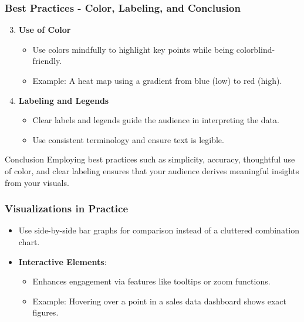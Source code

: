 \documentclass[aspectratio=169]{beamer}
\begin{document}
\begin{frame}[fragile]
    \frametitle{Best Practices - Color, Labeling, and Conclusion}
    \begin{enumerate}
        \setcounter{enumi}{2} %
        \item \textbf{Use of Color}
            \begin{itemize}
                \item Use colors mindfully to highlight key points while being colorblind-friendly.
                \item Example: A heat map using a gradient from blue (low) to red (high).
            \end{itemize}

        \item \textbf{Labeling and Legends}
            \begin{itemize}
                \item Clear labels and legends guide the audience in interpreting the data.
                \item Use consistent terminology and ensure text is legible.
            \end{itemize}
    \end{enumerate}

    \begin{block}{Conclusion}
    Employing best practices such as simplicity, accuracy, thoughtful use of color, and clear labeling ensures that your audience derives meaningful insights from your visuals.
    \end{block}
\end{frame}

\begin{frame}[fragile]
    \frametitle{Visualizations in Practice}
    \begin{itemize}
        \item Use side-by-side bar graphs for comparison instead of a cluttered combination chart.
        \item \textbf{Interactive Elements}:
            \begin{itemize}
                \item Enhances engagement via features like tooltips or zoom functions.
                \item Example: Hovering over a point in a sales data dashboard shows exact figures.
            \end{itemize}
    \end{itemize}
\end{frame}
\end{document}
